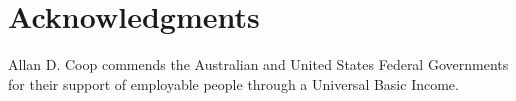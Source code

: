 \documentclass[10pt,letterpaper]{article}
\begin{document}
\section*{Acknowledgments}

Allan D. Coop commends the Australian and United States Federal Governments for their support of employable people through a Universal Basic Income.

\nolinenumbers

%
%
% 


% 




\end{document}
